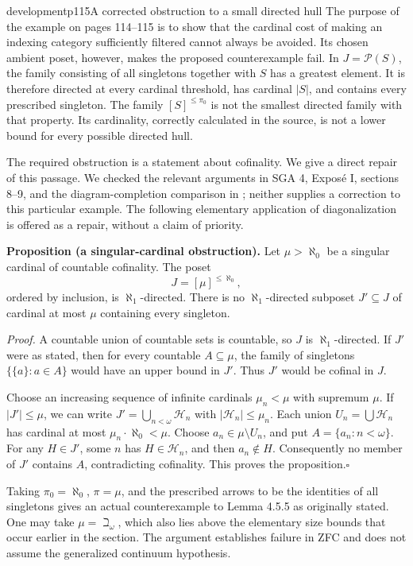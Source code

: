 \begin{dcomment}{development}{p115}{A corrected obstruction to a small directed hull}
The purpose of the example on pages 114--115 is to show that the cardinal cost of making an indexing category sufficiently filtered cannot always be avoided. Its chosen ambient poset, however, makes the proposed counterexample fail. In $J=\mathcal P(S)$, the family consisting of all singletons together with $S$ has a greatest element. It is therefore directed at every cardinal threshold, has cardinal $|S|$, and contains every prescribed singleton. The family $[S]^{\leq\pi_0}$ is not the smallest directed family with that property. Its cardinality, correctly calculated in the source, is not a lower bound for every possible directed hull.

The required obstruction is a statement about cofinality. We give a direct repair of this passage. We checked the relevant arguments in SGA 4, Expos\'e I, sections 8--9, and the diagram-completion comparison in \citet{Henry2025}; neither supplies a correction to this particular example. The following elementary application of diagonalization is offered as a repair, without a claim of priority.

\textbf{Proposition (a singular-cardinal obstruction).}\ours{}
Let $\mu>\aleph_0$ be a singular cardinal of countable cofinality. The poset
\[
J=[\mu]^{\leq\aleph_0},
\]
ordered by inclusion, is $\aleph_1$-directed. There is no $\aleph_1$-directed subposet $J'\subseteq J$ of cardinal at most $\mu$ containing every singleton.

\textit{Proof.} A countable union of countable sets is countable, so $J$ is $\aleph_1$-directed. If $J'$ were as stated, then for every countable $A\subseteq\mu$, the family of singletons $\{\{a\}:a\in A\}$ would have an upper bound in $J'$. Thus $J'$ would be cofinal in $J$.

Choose an increasing sequence of infinite cardinals $\mu_n<\mu$ with supremum $\mu$. If $|J'|\leq\mu$, we can write $J'=\bigcup_{n<\omega}\mathcal H_n$ with $|\mathcal H_n|\leq\mu_n$. Each union $U_n=\bigcup\mathcal H_n$ has cardinal at most $\mu_n\cdot\aleph_0<\mu$. Choose $a_n\in\mu\setminus U_n$, and put $A=\{a_n:n<\omega\}$. For any $H\in J'$, some $n$ has $H\in\mathcal H_n$, and then $a_n\notin H$. Consequently no member of $J'$ contains $A$, contradicting cofinality. This proves the proposition.\hfill$\square$

Taking $\pi_0=\aleph_0$, $\pi=\mu$, and the prescribed arrows to be the identities of all singletons gives an actual counterexample to Lemma 4.5.5 as originally stated. One may take $\mu=\beth_\omega$, which also lies above the elementary size bounds that occur earlier in the section. The argument establishes failure in ZFC and does not assume the generalized continuum hypothesis.


\end{dcomment}
